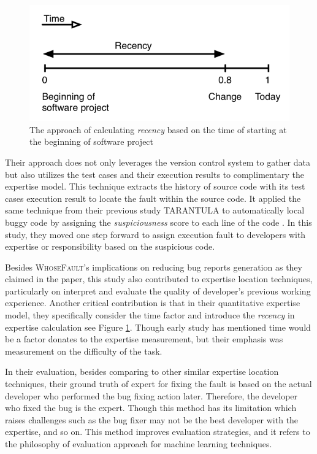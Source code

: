 \begin{figure}
\includegraphics[width = 0.5\columnwidth]{recency.png}
\centering
\caption{The approach of calculating \textit{recency} based on the time of starting at the beginning of software project \cite{servant2012whosefault}}
\label{recency}
\end{figure}

Their approach does not only leverages the version control system to gather data but also utilizes the test cases and their execution results to complimentary the expertise model. This technique extracts the history of source code with its test cases execution result to locate the fault within the source code. It applied the same technique from their previous study \textsc{TARANTULA} to automatically local buggy code by assigning the \textit{suspiciousness} score to each line of the code \cite{jones2002visualization}. In this study, they moved one step forward to assign execution fault to developers with expertise or responsibility based on the suspicious code.

Besides \textsc{WhoseFault}'s implications on reducing bug reports generation as they claimed in the paper, this study also contributed to expertise location techniques, particularly on interpret and evaluate the quality of developer's previous working experience. Another critical contribution is that in their quantitative expertise model, they specifically consider the time factor and introduce the \textit{recency} in expertise calculation see Figure \ref{recency}. Though early study \cite{mockus2002expertise} has mentioned time would be a factor donates to the expertise measurement, but their emphasis was measurement on the difficulty of the task. 

In their evaluation, besides comparing to other similar expertise location techniques, their ground truth of expert for fixing the fault is based on the actual developer who performed the bug fixing action later. Therefore, the developer who fixed the bug is the expert. Though this method has its limitation which raises challenges such as the bug fixer may not be the best developer with the expertise, and so on. This method improves evaluation strategies, and it refers to the philosophy of evaluation approach for machine learning techniques. 

